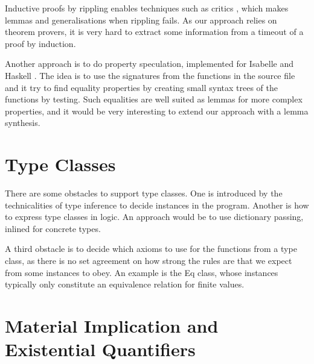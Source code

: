 Inductive proofs by rippling enables techniques such as critics
\citep{productiveuse}, which makes lemmas and generalisations when
rippling fails. As our approach relies on theorem provers, it is very
hard to extract some information from a timeout of a proof by induction.

Another approach is to do property speculation, implemented for
Isabelle \citep{isacosy} and Haskell \citep{quickspec}. The idea is to
use the signatures from the functions in the source file and it try to
find equality properties by creating small syntax trees of the
functions by testing. Such equalities are well suited as lemmas for
more complex properties, and it would be very interesting to extend
our approach with a lemma synthesis.


\section{Type Classes}
\label{sec:typeclasses}

There are some obstacles to support type classes. One is introduced by
the technicalities of type inference to decide instances in the
program. Another is how to express type classes in logic. An approach
would be to use dictionary passing, inlined for concrete types.

A third obstacle is to decide which axioms to use for the functions
from a type class, as there is no set agreement on how strong the
rules are that we expect from some instances to obey. An example
is the Eq class, whose instances typically only constitute an
equivalence relation for finite values.


\section{Material Implication and Existential Quantifiers}


